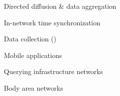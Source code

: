 
\centerline{}
\stopslide


\centerline{}
\stopslide


\begin{citemize}
  \item Directed diffusion \& data aggregation
  \item In-network time synchronization
  \item Data collection ()
  \item Mobile applications
  \begin{citemize}
    \item Querying infrastructure networks
    \item Body area networks
  \end{citemize}
\end{citemize}
\stopslide

